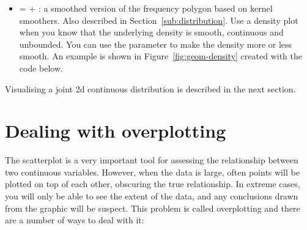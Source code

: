 \begin{itemize}
  \item {} =  + : a smoothed version of the frequency polygon based on kernel smoothers. Also described in Section~\ref{sub:distribution}. Use a density plot when you know that the underlying density is smooth, continuous and unbounded. You can use the  parameter to make the density more or less smooth. An example is shown in Figure~\ref{fig:geom-density} created with the code below.

    

\end{itemize}

Visualising a joint 2d continuous distribution is described in the next section.

\section{Dealing with overplotting}
\label{sec:overplotting}

The scatterplot is a very important tool for assessing the relationship between two continuous variables.  However, when the data is large, often points will be plotted on top of each other, obscuring the true relationship.  In extreme cases, you will only be able to see the extent of the data, and any conclusions drawn from the graphic will be suspect.  This problem is called overplotting and there are a number of ways to deal with it:

